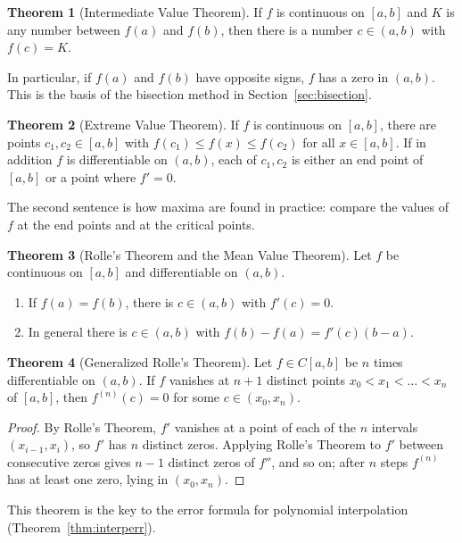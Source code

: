 \documentclass[11pt,a4paper]{article}
\numberwithin{equation}{section}
\theoremstyle{definition}
\newtheorem{thm}{Theorem}[subsection]
\begin{document}
\begin{thm}[Intermediate Value Theorem]
\label{thm:ivt}
If $f$ is continuous on $[a,b]$ and $K$ is any number between $f(a)$ and $f(b)$, then there is a number $c\in(a,b)$ with $f(c) = K$.
\end{thm}

In particular, if $f(a)$ and $f(b)$ have opposite signs, $f$ has a zero in $(a,b)$. This is the basis of the bisection method in
Section~\ref{sec:bisection}.

\begin{thm}[Extreme Value Theorem]
\label{thm:evt}
If $f$ is continuous on $[a,b]$, there are points $c_1,c_2\in[a,b]$ with $f(c_1)\leq f(x)\leq f(c_2)$ for all $x\in[a,b]$. If in
addition $f$ is differentiable on $(a,b)$, each of $c_1, c_2$ is either an end point of $[a,b]$ or a point where $f' = 0$.
\end{thm}

The second sentence is how maxima are found in practice: compare the values of $f$ at the end points and at the critical points.

\begin{thm}[Rolle's Theorem and the Mean Value Theorem]
\label{thm:mvt}
Let $f$ be continuous on $[a,b]$ and differentiable on $(a,b)$.
\begin{enumerate}
\item[(a)] If $f(a) = f(b)$, there is $c\in(a,b)$ with $f'(c) = 0$.
\item[(b)] In general there is $c\in(a,b)$ with $f(b) - f(a) = f'(c)(b-a)$.
\end{enumerate}
\end{thm}

\begin{thm}[Generalized Rolle's Theorem]
\label{thm:genrolle}
Let $f\in C[a,b]$ be $n$ times differentiable on $(a,b)$. If $f$ vanishes at $n+1$ distinct points $x_0<x_1<\dots<x_n$ of $[a,b]$, then
$f^{(n)}(c) = 0$ for some $c\in(x_0,x_n)$.
\end{thm}

\begin{proof}
By Rolle's Theorem, $f'$ vanishes at a point of each of the $n$ intervals $(x_{i-1},x_i)$, so $f'$ has $n$ distinct zeros. Applying Rolle's
Theorem to $f'$ between consecutive zeros gives $n-1$ distinct zeros of $f''$, and so on; after $n$ steps $f^{(n)}$ has at least one
zero, lying in $(x_0,x_n)$.
\end{proof}

This theorem is the key to the error formula for polynomial interpolation (Theorem~\ref{thm:interperr}).
\end{document}
